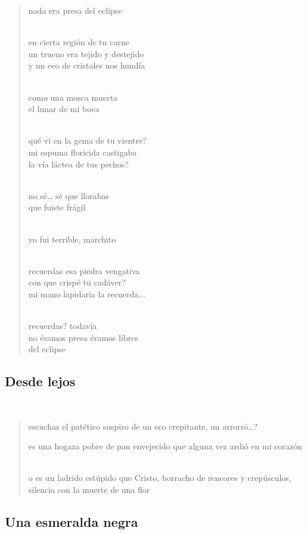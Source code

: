 \documentclass[a4paper, 12pt]{article}
\begin{document}
\begin{verse}
nada era presa del eclipse\\
~ 

en cierta región de tu carne\\
un trueno era tejido y destejido\\
y un eco de cristales nos hundía\\
~ 

como una mosca muerta\\
el lunar de mi boca\\
~ 

qué vi en la gema de tu vientre?\\
mi espuma floricida castigaba\\
la vía láctea de tus pechos?\\
~ 

no sé… sé que llorabas\\
que fuiste frágil\\
~ 

yo fui terrible, marchito\\
~ 

recuerdas esa piedra vengativa\\
con que crispé tu cadáver?\\
mi mano lapidaria la recuerda...\\
~ 

recuerdas? todavía\\
no éramos presa éramos libres\\
del eclipse\\

\end{verse}

\pagebreak 
\subsection{Desde lejos}
~

\begin{verse}
escuchas el patético suspiro
de un eco crepitante, un arrorró\ldots?
~

es una hogaza pobre de pan envejecido 
que alguna vez ardió en mi corazón 
~

o es un ladrido estúpido que Cristo,
borracho de rencores y crepúsculos,
silencia con la muerte de una flor
\end{verse}

\pagebreak 
\subsection{Una esmeralda negra}
~
\end{document}
